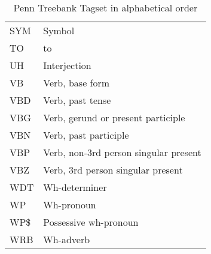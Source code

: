 \begin{table}[!htbp]
\begin{tabular}{|l|l|}
    SYM  & Symbol                                   \\
    TO   & to                                       \\
    UH   & Interjection                             \\
    VB   & Verb, base form                          \\
    VBD  & Verb, past tense                         \\
    VBG  & Verb, gerund or present participle       \\
    VBN  & Verb, past participle                    \\
    VBP  & Verb, non-3rd person singular present    \\
    VBZ  & Verb, 3rd person singular present        \\
    WDT  & Wh-determiner                            \\
    WP   & Wh-pronoun                               \\
    WP\$ & Possessive wh-pronoun                    \\
    WRB  & Wh-adverb                                \\ \hline
    \end{tabular}
    \caption{Penn Treebank Tagset in alphabetical order}
\end{table}

